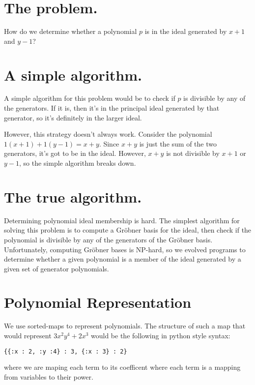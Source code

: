 \documentclass[20pt]{extarticle}
\begin{document}
\newpage
\section*{The problem.}

    How do we determine whether a polynomial $p$ is in the ideal generated by $x+1$ and $y-1$?

\newpage
\section*{A simple algorithm.}

    A simple algorithm for this problem would be to check if $p$ is divisible by any of the generators.
    If it is, then it's in the principal ideal generated by that generator, so it's definitely in the larger ideal.

    However, this strategy doesn't always work.
    Consider the polynomial $1(x+1) + 1(y-1) = x + y$.
    Since $x+y$ is just the sum of the two generators, it's got to be in the ideal.
    However, $x + y$ is not divisible by $x+1$ or $y-1$, so the simple algorithm breaks down.

\newpage
\section*{The true algorithm.}

    Determining polynomial ideal membership is hard.
    The simplest algorithm for solving this problem is to compute a Gr\"obner basis for the ideal, then check if the polynomial is divisible by any of the generators of the Gr\"obner basis.
    Unfortunately, computing Gr\"obner bases is NP-hard, so we evolved programs to determine whether a given polynomial is a member of the ideal generated by a given set of generator polynomials.

\newpage
\section*{Polynomial Representation}

We use sorted-maps to represent polynomials. The structure of such a map that would represent $3x^2y^4 + 2x^3$ would be the following in python style syntax:

\begin{verbatim}
{{:x : 2, :y :4} : 3, {:x : 3} : 2}
\end{verbatim}

 where we are maping each term to its coefficent where each term is a mapping from variables to their power.
\end{document}
